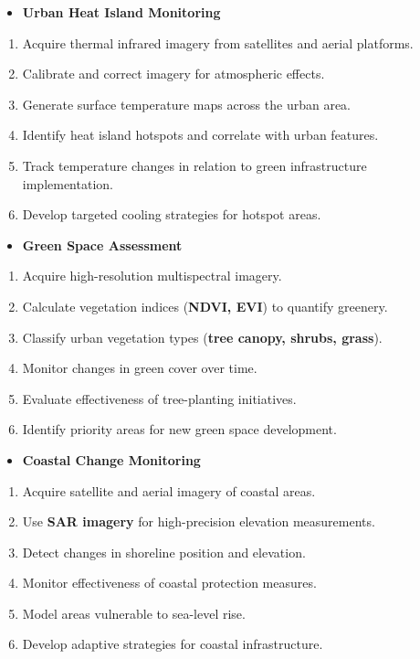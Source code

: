 \documentclass[
  letterpaper,
  DIV=11,
  numbers=noendperiod]{scrreprt}
\providecommand{\tightlist}{%
  \setlength{\itemsep}{0pt}\setlength{\parskip}{0pt}}\usepackage{longtable,booktabs,array}
\begin{document}
\begin{itemize}
\tightlist
\item
  \textbf{Urban Heat Island Monitoring}
\end{itemize}

\begin{enumerate}
\def\labelenumi{\arabic{enumi}.}
\tightlist
\item
  Acquire thermal infrared imagery from satellites and aerial platforms.
\item
  Calibrate and correct imagery for atmospheric effects.
\item
  Generate surface temperature maps across the urban area.
\item
  Identify heat island hotspots and correlate with urban features.
\item
  Track temperature changes in relation to green infrastructure
  implementation.
\item
  Develop targeted cooling strategies for hotspot areas.
\end{enumerate}

\begin{itemize}
\tightlist
\item
  \textbf{Green Space Assessment}
\end{itemize}

\begin{enumerate}
\def\labelenumi{\arabic{enumi}.}
\tightlist
\item
  Acquire high-resolution multispectral imagery.
\item
  Calculate vegetation indices (\textbf{NDVI, EVI}) to quantify
  greenery.
\item
  Classify urban vegetation types (\textbf{tree canopy, shrubs, grass}).
\item
  Monitor changes in green cover over time.
\item
  Evaluate effectiveness of tree-planting initiatives.
\item
  Identify priority areas for new green space development.
\end{enumerate}

\begin{itemize}
\tightlist
\item
  \textbf{Coastal Change Monitoring}
\end{itemize}

\begin{enumerate}
\def\labelenumi{\arabic{enumi}.}
\tightlist
\item
  Acquire satellite and aerial imagery of coastal areas.
\item
  Use \textbf{SAR imagery} for high-precision elevation measurements.
\item
  Detect changes in shoreline position and elevation.
\item
  Monitor effectiveness of coastal protection measures.
\item
  Model areas vulnerable to sea-level rise.
\item
  Develop adaptive strategies for coastal infrastructure.
\end{enumerate}
\end{document}
